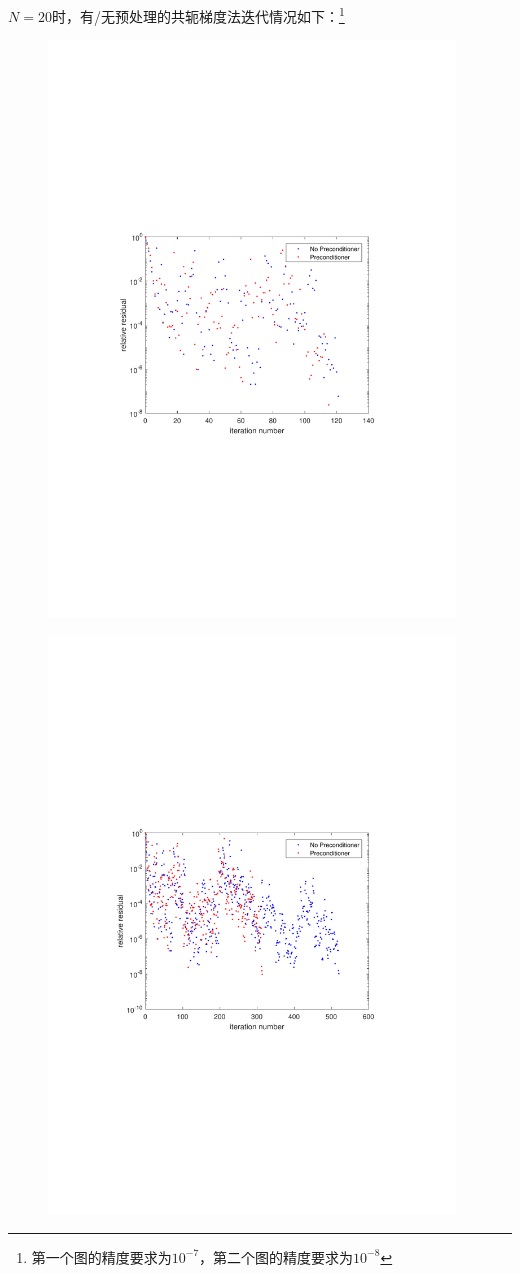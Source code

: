 $N=20$时，有/无预处理的共轭梯度法迭代情况如下：\footnote{第一个图的精度要求为$10^{-7}$，第二个图的精度要求为$10^{-8}$}
\begin{figure}[H]
\centering
\includegraphics[width=10.8cm]{fig/5_8.pdf}
\end{figure}

\begin{figure}[H]
\centering
\includegraphics[width=10.8cm]{fig/5_9.pdf}
\end{figure}
